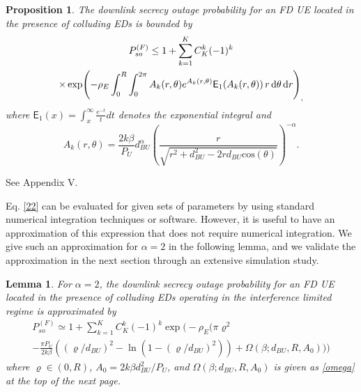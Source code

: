 \documentclass[10pt]{IEEEtran}
\newcommand{\rmd}{\,{\rm d}}
\newtheorem{prop}[thm]{Proposition}
\newtheorem{lem}[thm]{Lemma}
\begin{document}
\begin{prop}\label{prop4}
  The downlink secrecy outage probability for an FD UE located in the presence of colluding EDs is bounded by
\begin{multline}\label{22}
P^{(F)}_{so} \leq 1+\sum^K_{k=1}C^k_K(-1)^k \\
\times\exp\!\left(-\rho_E\int_0^{R}\int_0^{2\pi}A_k(r,\theta) e^{A_k(r,\theta)}\mathsf E_1\!\left(A_k(r,\theta)\right)r \rmd\theta \rmd r\right)_,
\end{multline}
where $\mathsf{E}_1(x) = \int^\infty_x\frac{e^{-t}}{t}dt$ denotes the exponential integral and
\begin{equation}
  A_k(r,\theta) = \frac{2k\beta}{P_U} d^\alpha_{BU}\left(\frac{r}{\sqrt{r^2+d_{BU}^2-2rd_{BU}\textrm{cos}(\theta)}}\right)^{-\alpha}.
\end{equation}
\end{prop}
\begin{IEEEproof}
See Appendix V.
\end{IEEEproof}
Eq. \eqref{22} can be evaluated for given sets of parameters by using standard numerical integration techniques or software.  However, it is useful to have an approximation of this expression that does not require numerical integration.  We give such an approximation for $\alpha = 2$ in the following lemma, and we validate the approximation in the next section through an extensive simulation study.
\begin{lem}\label{lemma2}
  For $\alpha = 2$, the downlink secrecy outage probability for an FD UE located in the presence of colluding EDs operating in the interference limited regime is approximated by
\begin{multline}\label{222}
P^{(F)}_{so} \simeq 1+\sum^K_{k=1}C^k_K(-1)^k \exp\!\Big(-\rho_E\big(\pi\varrho^2 \\
-\frac{\pi P_U}{2k\beta} \left(({\varrho}/{d_{BU}})^2 -\ln({1-({\varrho}/{d_{BU}})^2})\right)+\Omega(\beta;d_{BU},R,A_0)\big)\Big)
\end{multline}
where $\varrho\in(0, R)$, $A_0 = {2k\beta} d^2_{BU} /{P_U}$, and $\Omega(\beta;d_{BU},R,A_0)$ is given as \eqref{omega} at the top of the next page.
\end{lem}
\end{document}
